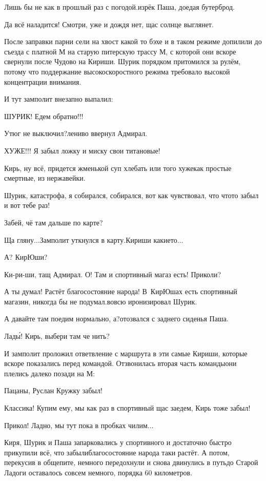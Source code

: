 \diagdash Лишь бы не как в прошлый раз с погодой.\mdash изрёк Паша, доедая бутерброд.

\diagdash Да всё наладится! Смотри, уже и дождя нет, щас солнце выглянет.

После заправки парни сели на хвост какой то бэхе и в таком режиме допилили до съезда с платной М на старую питерскую трассу М, с которой они вскоре свернули после Чудово на Кириши. Шурик порядком притомился за рулём, потому что поддержание высокоскоростного режима требовало высокой концентрации внимания. 

И тут замполит внезапно выпалил:

\diagdash ШУРИК! Едем обратно!!!

\diagdash Утюг не выключил?\mdash лениво ввернул Адмирал.

\diagdash ХУЖЕ!!! Я забыл ложку и миску свои титановые!

\diagdash Кирь, ну всё, придется жменькой суп хлебать или того хуже\mdash как простые смертные, из нержавейки.

\diagdash Шурик, катастрофа, я собирался, собирался, вот как чувствовал, что что\sdash то забыл и вот тебе раз!

\diagdash Забей, чё там дальше по карте?

\diagdash Ща гляну$\ldots$\mdash Замполит уткнулся в карту.\mdash Кириши какие\sdash то$\ldots$

\diagdash А? КирЮши?

\diagdash Ки-ри-ши, тащ Адмирал. О! Там и спортивный магаз есть! Приколи?

\diagdash А ты думал! Растёт благосостояние народа! В~КирЮшах есть спортивный магазин, никогда бы не подумал.\mdash вовсю иронизировал Шурик.

\diagdash А давайте там поедим нормально, а?\mdash отозвался с заднего сиденья Паша.

\diagdash Лад\'{ы}! Кирь, выбери там че нить?

И замполит проложил ответвление с маршрута в эти самые Кириши, которые вскоре показались перед командой. Отзвонилась вторая часть команды\mdash они плелись далеко позади на М:

\diagdash Пацаны, Руслан Кружку забыл!

\diagdash Классика! Купим ему, мы как раз в спортивный щас заедем, Кирь тоже забыл!

\diagdash Прикол! Ладно, мы тут пока в пробках чилим$\ldots$

Киря, Шурик и Паша запарковались у спортивного и достаточно быстро прикупили всё, что забыли\mdash благосостояние народа таки растёт. А потом, перекусив в общепите, немного передохнули и снова двинулись в путь\mdash до Старой Ладоги оставалось совсем немного, порядка 60 километров.


